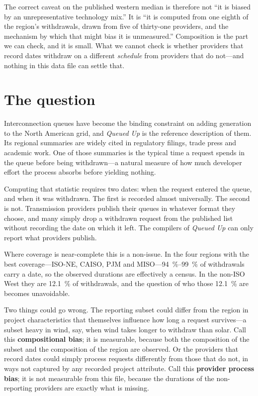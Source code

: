 \documentclass[11pt,a4paper]{article}
\begin{document}
The correct caveat on the published western median is therefore not ``it is
biased by an unrepresentative technology mix.'' It is ``it is computed from one
eighth of the region's withdrawals, drawn from five of thirty-one providers, and
the mechanism by which that might bias it is unmeasured.'' Composition is the
part we can check, and it is small. What we cannot check is whether providers
that record dates withdraw on a different \emph{schedule} from providers that do
not---and nothing in this data file can settle that.

\section{The question}

Interconnection queues have become the binding constraint on adding generation to
the North American grid, and \emph{Queued Up} is the reference description of
them. Its regional summaries are widely cited in regulatory filings, trade press
and academic work. One of those summaries is the typical time a request spends in
the queue before being withdrawn---a natural measure of how much developer effort
the process absorbs before yielding nothing.

Computing that statistic requires two dates: when the request entered the queue,
and when it was withdrawn. The first is recorded almost universally. The second
is not. Transmission providers publish their queues in whatever format they
choose, and many simply drop a withdrawn request from the published list without
recording the date on which it left. The compilers of \emph{Queued Up} can only
report what providers publish.

Where coverage is near-complete this is a non-issue. In the four regions with the
best coverage---ISO-NE, CAISO, PJM and MISO---\SIrange{94}{99}{\percent} of
withdrawals carry a date, so the observed durations are effectively a census. In
the non-ISO West they are \SI{12.1}{\percent} of withdrawals, and the question of
who those \SI{12.1}{\percent} are becomes unavoidable.

Two things could go wrong. The reporting subset could differ from the region in
project characteristics that themselves influence how long a request survives---a
subset heavy in wind, say, when wind takes longer to withdraw than solar. Call
this \textbf{compositional bias}; it is measurable, because both the composition
of the subset and the composition of the region are observed. Or the providers
that record dates could simply process requests differently from those that do
not, in ways not captured by any recorded project attribute. Call this
\textbf{provider process bias}; it is not measurable from this file, because the
durations of the non-reporting providers are exactly what is missing.
\end{document}
